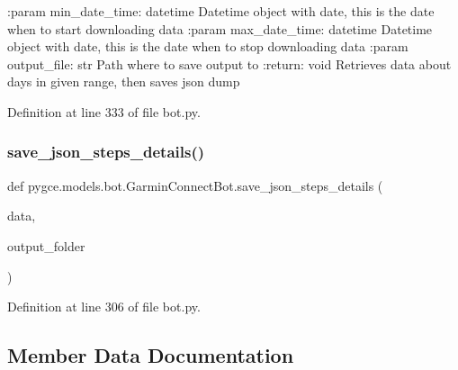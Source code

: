 \begin{DoxyVerb}:param min_date_time: datetime
    Datetime object with date, this is the date when to start downloading data
:param max_date_time: datetime
    Datetime object with date, this is the date when to stop downloading data
:param output_file: str
    Path where to save output to
:return: void
    Retrieves data about days in given range, then saves json dump
\end{DoxyVerb}
 

Definition at line 333 of file bot.\+py.

\mbox{\label{classpygce_1_1models_1_1bot_1_1_garmin_connect_bot_a987255466b3bb8f3f130376d2e07aa38}} 
\subsubsection{\texorpdfstring{save\+\_\+json\+\_\+steps\+\_\+details()}{save\_json\_steps\_details()}}
{\footnotesize\ttfamily def pygce.\+models.\+bot.\+Garmin\+Connect\+Bot.\+save\+\_\+json\+\_\+steps\+\_\+details (\begin{DoxyParamCaption}\item[{}]{data,  }\item[{}]{output\+\_\+folder }\end{DoxyParamCaption})\hspace{0.3cm}{\ttfamily [static]}}



Definition at line 306 of file bot.\+py.



\subsection{Member Data Documentation}
\mbox{\label{classpygce_1_1models_1_1bot_1_1_garmin_connect_bot_aad154f2121928191c68ac2f9530470e3}} 
